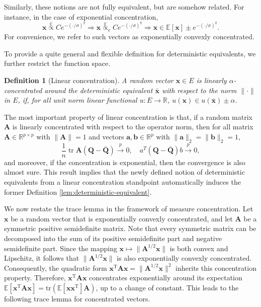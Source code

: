 \documentclass[12pt]{article}
\newtheorem{definition}{Definition}
\DeclareMathOperator{\tr}{tr}
\begin{document}
Similarly, these notions are not fully equivalent, but are somehow related. For instance, in the case of exponential concentration,
\begin{equation*}
\mathbf{x} \mathrel{\overset{\mathbb{E}}{\propto}} Ce^{-(\cdot/\sigma)^q} \Rightarrow \mathbf{x} \mathrel{\overset{\mathbb{E}}{\propto}}_{c} Ce^{-(\cdot/\sigma)^q} \Rightarrow \mathbf{x} \in \mathbb{E}[\mathbf{x}] \pm e^{-(\cdot/\sigma)^q}.
\end{equation*}
For convenience, we refer to such vectors as exponentially convexly concentrated.

To provide a quite general and flexible definition for deterministic equivalents, we further restrict the function space.
\begin{definition}[Linear concentration]
A random vector $\mathbf{x} \in E$ is linearly $\alpha$-concentrated around the deterministic equivalent $\bar{\mathbf{x}}$ with respect to the norm $\| \cdot \|$ in $E$, if, for all unit norm linear functional $u : E \to \mathbb{R}$, $u(\mathbf{x}) \in u(\bar{\mathbf{x}}) \pm \alpha$.
\end{definition}

The most important property of linear concentration is that, if a random matrix $\mathbf{A}$ is linearly concentrated with respect to the operator norm, then for all matrix $\mathbf{A}\in\mathbb{R}^{p\times p}$ with $\|\mathbf{A}\| = 1$ and vectors $\mathbf{a}, \mathbf{b}\in\mathbb{R}^{p}$ with $\|\mathbf{a}\|_2 = \|\mathbf{b}\|_2 = 1$,
$$
\frac{1}{n} \tr \mathbf{A}(\mathbf{Q} - \bar{\mathbf{Q}}) \xrightarrow{p} 0, \quad a^T(\mathbf{Q} - \bar{\mathbf{Q}})b \xrightarrow{p} 0,
$$
and moreover, if the concentration is exponential, then the convergence is also almost sure. This result implies that the newly defined notion of deterministic equivalents from a linear concentration standpoint automatically induces the former Definition \ref{lem:deterministic-equivalent}.

We now restate the trace lemma in the framework of measure concentration. Let $\mathbf{x}$ be a random vector that is exponentially convexly concentrated, and let $\mathbf{A}$ be a symmetric positive semidefinite matrix. Note that every symmetric matrix can be decomposed into the sum of its positive semidefinite part and negative semidefinite part. Since the mapping $\mathbf{x} \mapsto \| \mathbf{A}^{1/2} \mathbf{x} \|$ is both convex and Lipschitz, it follows that $\| \mathbf{A}^{1/2} \mathbf{x} \|$ is also exponentially convexly concentrated. Consequently, the quadratic form $\mathbf{x}^{\mathrm{T}} \mathbf{A} \mathbf{x} = \| \mathbf{A}^{1/2} \mathbf{x} \|^2$ inherits this concentration property. Therefore, $\mathbf{x}^{\mathrm{T}} \mathbf{A} \mathbf{x}$ concentrates exponentially around its expectation $\mathbb{E}[\mathbf{x}^{\mathrm{T}} \mathbf{A} \mathbf{x}] = \mathrm{tr}(\mathbb{E}[\mathbf{x} \mathbf{x}^{\mathrm{T}}] \mathbf{A})$, up to a change of constant. This leads to the following trace lemma for concentrated vectors.
\end{document}

